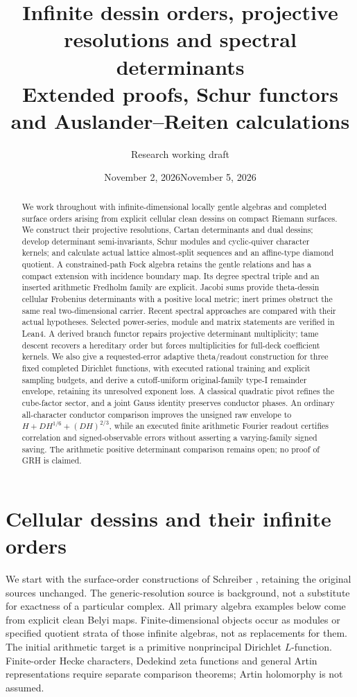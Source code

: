 \documentclass[11pt]{article}
\date{November 2, 2026}
\date{November 5, 2026}
\title{Infinite dessin orders, projective resolutions and spectral determinants\\\large Extended proofs, Schur functors and Auslander--Reiten calculations}
\author{Research working draft}
\theoremstyle{definition}\newtheorem{definition}[theorem]{Definition}
\theoremstyle{remark}\newtheorem{remark}[theorem]{Remark}
\begin{document}
\maketitle
\begin{abstract}
We work throughout with infinite-dimensional locally gentle algebras and completed surface orders arising from explicit cellular clean dessins on compact Riemann surfaces. We construct their projective resolutions, Cartan determinants and dual dessins; develop determinant semi-invariants, Schur modules and cyclic-quiver character kernels; and calculate actual lattice almost-split sequences and an affine-type diamond quotient. A constrained-path Fock algebra retains the gentle relations and has a compact extension with incidence boundary map. Its degree spectral triple and an inserted arithmetic Fredholm family are explicit. Jacobi sums provide theta-dessin cellular Frobenius determinants with a positive local metric; inert primes obstruct the same real two-dimensional carrier. Recent spectral approaches are compared with their actual hypotheses. Selected power-series, module and matrix statements are verified in Lean4. A derived branch functor repairs projective determinant multiplicity; tame descent recovers a hereditary order but forces multiplicities for full-deck coefficient kernels. We also give a requested-error adaptive theta/readout construction for three fixed completed Dirichlet functions, with executed rational training and explicit sampling budgets, and derive a cutoff-uniform original-family type-I remainder envelope, retaining its unresolved exponent loss. A classical quadratic pivot refines the cube-factor sector, and a joint Gauss identity preserves conductor phases. An ordinary all-character conductor comparison improves the unsigned raw envelope to $H+DH^{1/6}+(DH)^{2/3}$, while an executed finite arithmetic Fourier readout certifies correlation and signed-observable errors without asserting a varying-family signed saving. The arithmetic positive determinant comparison remains open; no proof of GRH is claimed.\end{abstract}
{\small\tableofcontents}
\section{Cellular dessins and their infinite orders}
We start with the surface-order constructions of Schreiber \cite{SurfaceOrders,SurfaceDuality}, retaining the original sources unchanged. The generic-resolution source \cite{Persistence} is background, not a substitute for exactness of a particular complex. All primary algebra examples below come from explicit clean Belyi maps. Finite-dimensional objects occur as modules or specified quotient strata of those infinite algebras, not as replacements for them. The initial arithmetic target is a primitive nonprincipal Dirichlet $L$-function. Finite-order Hecke characters, Dedekind zeta functions and general Artin representations require separate comparison theorems; Artin holomorphy is not assumed.
\end{document}
